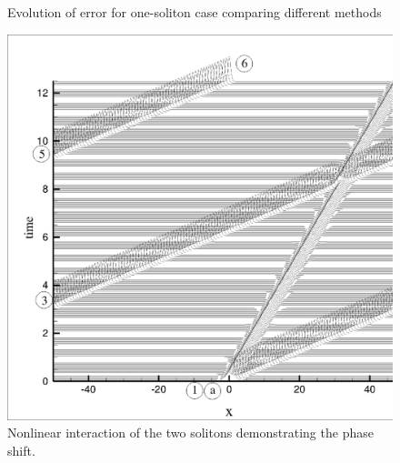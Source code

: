 \documentclass{svjour3}                    %
\begin{document}
\begin{figure}[h!]
{
}
\caption{Evolution of error for one-soliton case comparing different methods}
\label{fig:one2}
\end{figure}

\begin{figure}[h!]
\center
\includegraphics[width=0.65\linewidth]{Fig_14}
\caption{Nonlinear interaction of the two solitons demonstrating the phase shift.}
\label{fig:twointeract}
\end{figure}
\end{document}
